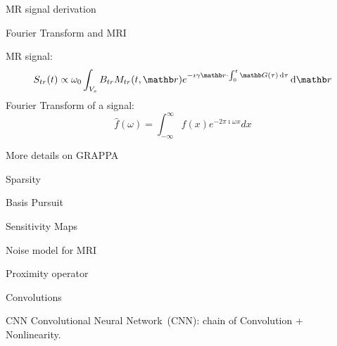 \begin{frame}{MR signal derivation}
\end{frame}

\begin{frame}{Fourier Transform and MRI}
    \begin{multicols}{2}
        MR signal:
        \begin{equation*}
            \vspace{\baselineskip}
            S_{tr}(t) \propto \omega_0  \int_{V_s} B_{tr} M_{tr}(t, \rb) e^{-\imath \gamma \rb \cdot \int_0^t \Gb(\tau)  \dif \tau} \dif \rb
        \end{equation*}
        \newpage
        Fourier Transform of a signal:
        \begin{equation*}
            \hat{f}(\omega) = \int_{-\infty}^{\infty} f(x) e^{-2\pi \imath \omega x} dx
        \end{equation*}
    \end{multicols}
\end{frame}

\begin{frame}{More details on GRAPPA}

\end{frame}

\begin{frame}{Sparsity}

\end{frame}

\begin{frame}{Basis Pursuit}

\end{frame}

\begin{frame}{Sensitivity Maps}

\end{frame}

\begin{frame}{Noise model for MRI}

\end{frame}

\begin{frame}{Proximity operator}

\end{frame}

\begin{frame}{Convolutions}

\end{frame}

\begin{frame}{CNN}
    Convolutional Neural Network~(CNN): chain of Convolution + Nonlinearity.
\end{frame}

